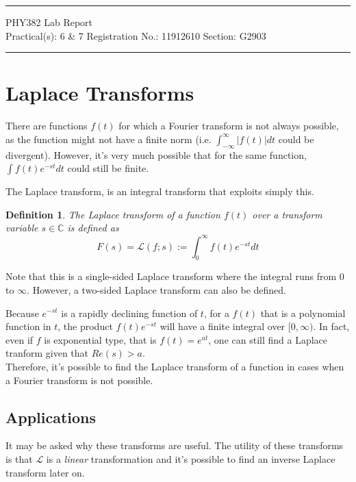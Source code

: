 \documentclass[11pt]{article}
\newtheorem{defn}{Definition}
\begin{document}
	
	\author{Aayush Arya}
	\date{(Submitted: \today)}
	\title{}
	
	\maketitle
	
	\hrule
	\begin{center}
		PHY382 Lab Report\\
		Practical(s): 6 \& 7 \quad Registration No.: 11912610 \quad Section: G2903
	\end{center}
	\hrule
	
	\section*{Laplace Transforms}
	There are functions $f(t)$ for which a Fourier transform is not always possible, as the function might not have a finite norm (i.e. $\int_{-\infty}^\infty |f(t)| dt$ could be divergent). However, it's very much possible that for the same function, $\int f(t)e^{-st}dt$ could still be finite. 
	
	The Laplace transform, is an integral transform that exploits simply this. 

	
	\begin{defn}
		The {\it Laplace transform} of a function $f(t)$ over a transform variable $s \in \mathbb{C}$ is defined as \[ F(s) = \mathcal{L}(f; s) := \int_0^\infty f(t) e^{-st} dt\] 
	\end{defn}
	Note that this is a single-sided Laplace transform where the integral runs from $0$ to $\infty$. However, a two-sided Laplace transform can also be defined.
	
	Because $e^{-st}$ is a rapidly declining function of $t$, for a $f(t)$ that is a polynomial function in $t$, the product $f(t)e^{-st}$ will have a finite integral over $[0, \infty)$. In fact, even if $f$ is exponential type, that is $f(t) = e^{at}$, one can still find a Laplace tranform given that $Re(s) > a$.\\
	
	Therefore, it's possible to find the Laplace transform of a function in cases when a Fourier transform is not possible.
	
	\subsection*{Applications}
	It may be asked why these transforms are useful. The utility of these transforms is that $\mathcal{L}$ is a {\it linear} transformation and it's possible to find an inverse Laplace transform later on.
	
\end{document}
